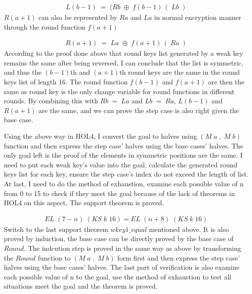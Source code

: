 \documentclass{article}
\begin{document}
\begin{equation}
\begin{split}
   L(b-1) \; = \; (Rb \; \oplus \; f(b-1)\,(\;Lb\;)
\end{split}
\end{equation}
$R(a+1)$ can also be represented by $Ra$ and $La$ in normal encryption manner through the round function $f(a+1)$

\begin{equation}
\begin{split}
   R(a+1) \; = \; La \; \oplus \; f(a+1)\,(\;Ra\;)
\end{split}
\end{equation}
According to the proof
done above that round keys list generated by a weak key remains the same after being reversed, I can conclude that the list
is  symmetric, and thus the $(b-1)$th and $(a+1)$th round keys are the same in the round keys list of length 16.
The round function $f(b-1)$ and $f(a+1)$ are then the same as round key is the only change variable for round functions in different
rounds. By combining this with $Rb\;= \; La$ and $Lb\;= \; Ra$, $L(b-1)$ and $R(a+1)$ are the same, and we can prove the step
case is also right given the base case.

Using the above way in HOL4, I convert the goal to halves using $(M\;a\;,\;M\;b)$ function and then
express the step case' halves using the base cases' halves. The only goal left is the proof of the elements in
symmetric positions are the same. I need to put each weak key's value into the goal, calculate the generated
round keys list for each key, ensure the step case's index do not exceed the length of list. At last, I need to
do the method of exhaustion, examine each possible value of n from 0 to 15 to check if they meet the goal because of
the lack of theorems in HOL4 on this aspect. The support theorem is proved.

\begin{equation}
\begin{split}
 EL \; (7-n) \; (KS \; k \; 16) = EL \; (n+8) \; (KS \; k \; 16)
\end{split}
\end{equation}
Switch to the last support theorem $wkey1\_equal$ mentioned above. It is also proved by induction, the base case can
be directly proved by the base case of $Round$. The indcution step is proved in the same way as above by transforming
the $Round$ function to $(M\;a\;,\;M\;b)$ form first and then express the step case' halves using the base cases' halves.
The last part of verification is also examine each possible value of n to the goal, use the method of exhaustion to
test all situations meet the goal and the theorem is proved.
\end{document}

